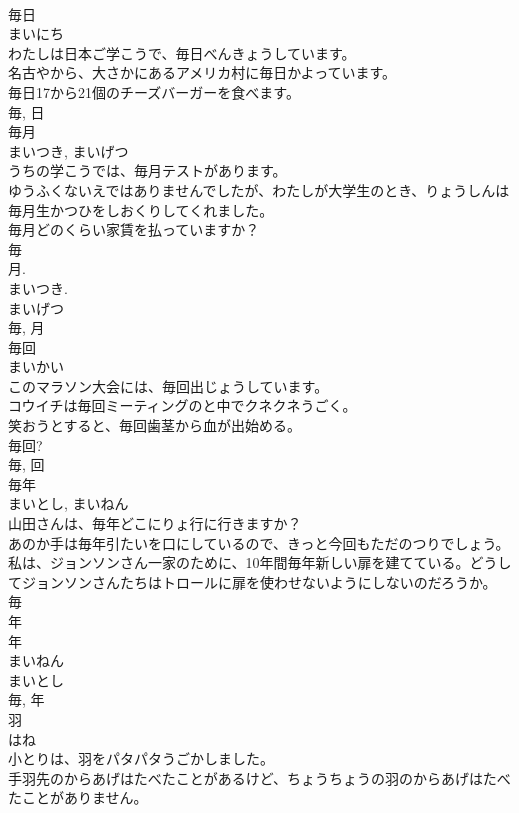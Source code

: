\documentclass[8pt]{extreport}
\begin{document}
\begin{CJK}{UTF8}{min}
\\	毎日	
\\	まいにち	
\\	わたしは日本ご学こうで、毎日べんきょうしています。	
\\	名古やから、大さかにあるアメリカ村に毎日かよっています。	
\\	毎日17から21個のチーズバーガーを食べます。	
\\	毎, 日	
\\	毎月	
\\	まいつき, まいげつ	
\\	うちの学こうでは、毎月テストがあります。	
\\	ゆうふくないえではありませんでしたが、わたしが大学生のとき、りょうしんは毎月生かつひをしおくりしてくれました。	
\\	毎月どのくらい家賃を払っていますか？	
\\	毎 
\\	月. 
\\	まいつき. 
\\	まいげつ 
\\	毎, 月	
\\	毎回	
\\	まいかい	
\\	このマラソン大会には、毎回出じょうしています。	
\\	コウイチは毎回ミーティングのと中でクネクネうごく。	
\\	笑おうとすると、毎回歯茎から血が出始める。	
\\	毎回?	
\\	毎, 回	
\\	毎年	
\\	まいとし, まいねん	
\\	山田さんは、毎年どこにりょ行に行きますか？	
\\	あのか手は毎年引たいを口にしているので、きっと今回もただのつりでしょう。	
\\	私は、ジョンソンさん一家のために、10年間毎年新しい扉を建てている。どうしてジョンソンさんたちはトロールに扉を使わせないようにしないのだろうか。	
\\	毎 
\\	年 
\\	年 
\\	まいねん 
\\	まいとし 
\\	毎, 年	
\\	羽	
\\	はね	
\\	小とりは、羽をパタパタうごかしました。	
\\	手羽先のからあげはたべたことがあるけど、ちょうちょうの羽のからあげはたべたことがありません。	

\end{CJK}
\end{document}
